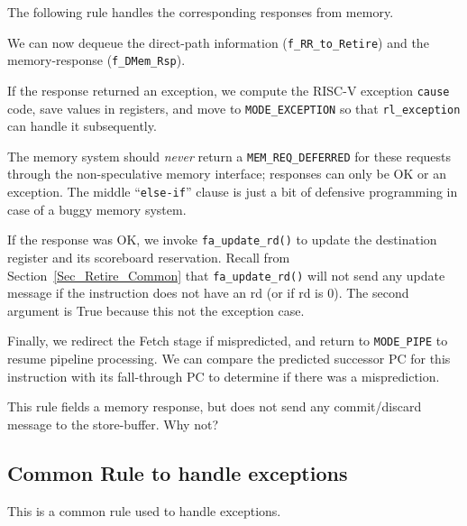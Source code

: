 \label{Sec_Fife_Retire_DMem_deferred}

The following rule handles the corresponding responses from memory.


We can now dequeue the direct-path information (\verb|f_RR_to_Retire|)
and the memory-response (\verb|f_DMem_Rsp|).

If the response returned an exception, we compute the RISC-V exception
\verb|cause| code, save values in registers, and move to
\verb|MODE_EXCEPTION| so that \verb|rl_exception| can handle it
subsequently.

The memory system should \emph{never} return a \verb|MEM_REQ_DEFERRED|
for these requests through the non-speculative memory interface;
responses can only be OK or an exception.  The middle
``\verb|else-if|'' clause is just a bit of defensive programming in
case of a buggy memory system.

If the response was OK, we invoke \verb|fa_update_rd()| to update the
destination register and its scoreboard reservation.  Recall from
Section~\ref{Sec_Retire_Common} that \verb|fa_update_rd()| will not
send any update message if the instruction does not have an rd (or if
rd is 0).  The second argument is True because this not the exception
case.

Finally, we redirect the Fetch stage if mispredicted, and return to
\verb|MODE_PIPE| to resume pipeline processing.  We can compare the
predicted successor PC for this instruction with its fall-through PC
to determine if there was a misprediction.


\Exercise

This rule fields a memory response, but does not send any
commit/discard message to the store-buffer.  Why not?

\Endexercise


\subsection{Common Rule to handle exceptions}

\label{Sec_Fife_Exception}

This is a common rule used to handle exceptions.


